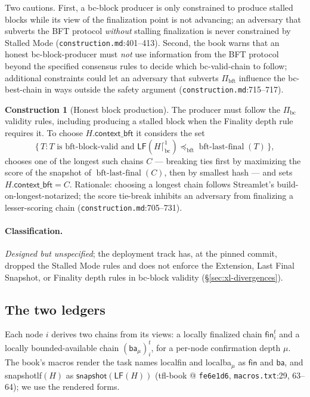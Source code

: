 \documentclass[11pt,a4paper]{article}
\theoremstyle{definition}
\newtheorem{construction}[theorem]{Construction}
\begin{document}
Two cautions. First, a bc-block producer is only constrained to produce
stalled blocks while its view of the finalization point is not advancing;
an adversary that subverts the BFT protocol \emph{without} stalling
finalization is never constrained by Stalled Mode
(\texttt{construction.md}:401--413). Second, the book warns that an
honest bc-block-producer must \emph{not} use information from the BFT
protocol beyond the specified consensus rules to decide which
bc-valid-chain to follow; additional constraints could let an adversary
that subverts $\Pi_{\mathrm{bft}}$ influence the bc-best-chain in ways
outside the safety argument (\texttt{construction.md}:715--717).

\begin{construction}[Honest block production]\label{def:xl-honest-production}
The producer must follow the $\Pi_{\mathrm{bc}}$ validity rules,
including producing a stalled block when the Finality depth rule requires
it. To choose $H.\mathsf{context\_bft}$ it considers the set
\[
\{\, T : T \text{ is bft-block-valid and }
  \mathsf{LF}(H \lceil^{1}_{\mathrm{bc}}) \preceq_{\mathrm{bft}}
  \operatorname{bft\text{-}last\text{-}final}(T) \,\},
\]
chooses one of the longest such chains $C$ --- breaking ties first by
maximizing the score of the snapshot of
$\operatorname{bft\text{-}last\text{-}final}(C)$, then by smallest hash
--- and sets $H.\mathsf{context\_bft} = C$.
Rationale: choosing a longest chain follows Streamlet's
build-on-longest-notarized; the score tie-break inhibits an adversary
from finalizing a lesser-scoring chain
(\texttt{construction.md}:705--731).
\end{construction}

\paragraph{Classification.} \emph{Designed but unspecified}; the
deployment track has, at the pinned commit, dropped the Stalled Mode
rules and does not enforce the Extension, Last Final Snapshot, or
Finality depth rules in bc-block validity (\S\ref{sec:xl-divergences}).

\subsection{The two ledgers}\label{sec:xl-ledgers}

Each node $i$ derives two chains from its views: a locally finalized
chain $\mathsf{fin}_i^t$ and a locally bounded-available chain
$(\mathsf{ba}_{\mu})_i^t$, for a per-node confirmation depth $\mu$. The
book's macros render the task names \textsf{localfin} and
\textsf{localba}$_{\mu}$ as $\mathsf{fin}$ and $\mathsf{ba}$, and
\textsf{snapshotlf}$(H)$ as
$\mathsf{snapshot}(\mathsf{LF}(H))$ (tfl-book @ \texttt{fe6e1d6},
\texttt{macros.txt}:29, 63--64); we use the rendered forms.
\end{document}
